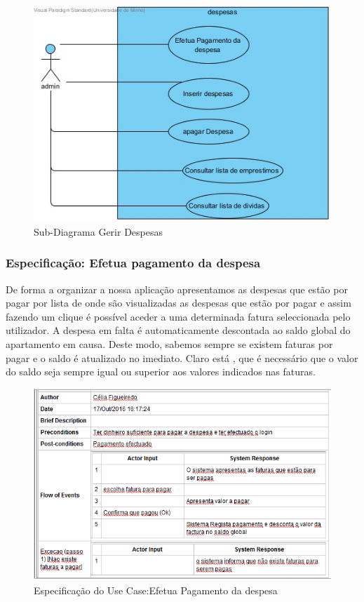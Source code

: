 \begin{figure}[htb!]
	\centering
	\includegraphics[scale=0.5]{imagens/UseCase/GerirDespesas}  
	\caption{Sub-Diagrama Gerir Despesas }  
\end{figure}

\subsubsection{Especificação: Efetua pagamento da despesa}

De forma a organizar a nossa aplicação apresentamos as despesas que estão por pagar por lista de onde são visualizadas as despesas que estão por pagar e assim fazendo um clique é possível aceder a uma determinada fatura seleccionada pelo utilizador.  A despesa em falta é automaticamente descontada ao saldo global do apartamento em causa. Deste modo, sabemos sempre se existem faturas por pagar e o saldo é atualizado no imediato. Claro está , que é necessário que o valor do saldo seja sempre igual ou superior aos valores indicados nas faturas.


\begin{figure}[htb!]
	\centering
	\includegraphics[scale=0.6]{imagens/Especificacoes/efetuapagdespesa}  
	\caption{Especificação do Use Case:Efetua Pagamento da despesa  }  
\end{figure}

